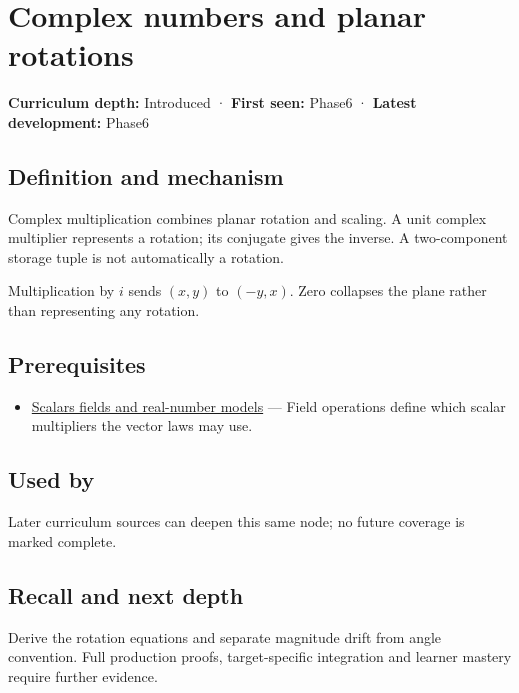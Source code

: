 \hypertarget{appendix-f77eadcc4a93}{}
\section{Complex numbers and planar rotations}\label{appendix-f77eadcc4a93-complex-numbers-and-planar-rotations}

\textbf{Curriculum depth:} Introduced · \textbf{First seen:} Phase6 · \textbf{Latest development:} Phase6

\subsection{Definition and mechanism}\label{appendix-f77eadcc4a93-definition-and-mechanism}

Complex multiplication combines planar rotation and scaling. A unit complex multiplier represents a rotation; its conjugate gives the inverse. A two-component storage tuple is not automatically a rotation.

Multiplication by \(i\) sends \((x,y)\) to \((-y,x)\). Zero collapses the plane rather than representing any rotation.

\subsection{Prerequisites}\label{appendix-f77eadcc4a93-prerequisites}

\begin{itemize}
\tightlist
\item
  \hyperref[appendix-52051ad550fe]{Scalars fields and real-number models} --- Field operations define which scalar multipliers the vector laws may use.
\end{itemize}

\subsection{Used by}\label{appendix-f77eadcc4a93-used-by}

Later curriculum sources can deepen this same node; no future coverage is marked complete.

\subsection{Recall and next depth}\label{appendix-f77eadcc4a93-recall-and-next-depth}

Derive the rotation equations and separate magnitude drift from angle convention. Full production proofs, target-specific integration and learner mastery require further evidence.

